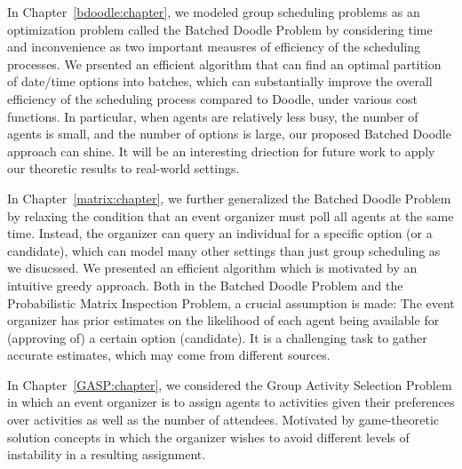 \label{discussion:chapter}

In Chapter~\ref{bdoodle:chapter}, we modeled group scheduling problems as an optimization problem called the Batched Doodle Problem by considering time and inconvenience as two important meausres of efficiency of the scheduling processes. We prsented an efficient algorithm that can find an optimal partition of date/time options into batches, which can substantially improve the overall efficiency of the scheduling process compared to Doodle, under various cost functions. In particular, when agents are relatively less busy, the number of agents is small, and the number of options is large, our proposed Batched Doodle approach can shine. It will be an interesting driection for future work to apply our theoretic results to real-world settings.

In Chapter~\ref{matrix:chapter}, we further generalized the Batched Doodle Problem by relaxing the condition that an event organizer must poll all agents at the same time. Instead, the organizer can query an individual for a specific option (or a candidate), which can model many other settings than just group scheduling as we disucssed. We presented an efficient algorithm which is motivated by an intuitive greedy approach. Both in the Batched Doodle Problem and the Probabilistic Matrix Inspection Problem, a crucial assumption is made: The event organizer has prior estimates on the likelihood of each agent being available for (approving of) a certain option (candidate). It is a challenging task to gather accurate estimates, which may come from different sources. 

In Chapter~\ref{GASP:chapter}, we considered the Group Activity Selection Problem in which an event organizer is to assign agents to activities given their preferences over activities as well as the number of attendees. Motivated by game-theoretic solution concepts in which the organizer wishes to avoid different levels of instability in a resulting assignment. 